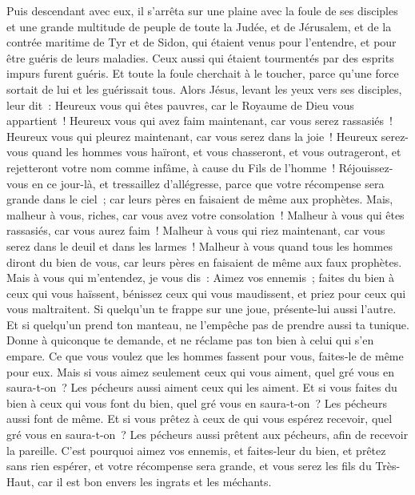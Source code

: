 \begin{multicols}{2}
Puis descendant avec eux, il s'arrêta sur une plaine avec la foule de ses disciples et une grande multitude de peuple de toute la Judée, et de Jérusalem, et de la contrée maritime de Tyr et de Sidon, qui étaient venus pour l'entendre, et pour être guéris de leurs maladies.
Ceux aussi qui étaient tourmentés par des esprits impurs furent guéris.
Et toute la foule cherchait à le toucher, parce qu'une force sortait de lui et les guérissait tous.
Alors Jésus, levant les yeux vers ses disciples, leur dit~: Heureux vous qui êtes pauvres, car le Royaume de Dieu vous appartient~!
Heureux vous qui avez faim maintenant, car vous serez rassasiés~! Heureux vous qui pleurez maintenant, car vous serez dans la joie~!
Heureux serez-vous quand les hommes vous haïront, et vous chasseront, et vous outrageront, et rejetteront votre nom comme infâme, à cause du Fils de l'homme~!
Réjouissez-vous en ce jour-là, et tressaillez d'allégresse, parce que votre récompense sera grande dans le ciel~; car leurs pères en faisaient de même aux prophètes.
Mais, malheur à vous, riches, car vous avez votre consolation~!
Malheur à vous qui êtes rassasiés, car vous aurez faim~! Malheur à vous qui riez maintenant, car vous serez dans le deuil et dans les larmes~!
Malheur à vous quand tous les hommes diront du bien de vous, car leurs pères en faisaient de même aux faux prophètes.
Mais à vous qui m'entendez, je vous dis~: Aimez vos ennemis~; faites du bien à ceux qui vous haïssent,
bénissez ceux qui vous maudissent, et priez pour ceux qui vous maltraitent.
Si quelqu'un te frappe sur une joue, présente-lui aussi l'autre. Et si quelqu'un prend ton manteau, ne l'empêche pas de prendre aussi ta tunique.
Donne à quiconque te demande, et ne réclame pas ton bien à celui qui s'en empare.
Ce que vous voulez que les hommes fassent pour vous, faites-le de même pour eux.
Mais si vous aimez seulement ceux qui vous aiment, quel gré vous en saura-t-on~? Les pécheurs aussi aiment ceux qui les aiment.
Et si vous faites du bien à ceux qui vous font du bien, quel gré vous en saura-t-on~? Les pécheurs aussi font de même.
Et si vous prêtez à ceux de qui vous espérez recevoir, quel gré vous en saura-t-on~? Les pécheurs aussi prêtent aux pécheurs, afin de recevoir la pareille.
C'est pourquoi aimez vos ennemis, et faites-leur du bien, et prêtez sans rien espérer, et votre récompense sera grande, et vous serez les fils du Très-Haut, car il est bon envers les ingrats et les méchants.

\end{multicols}
